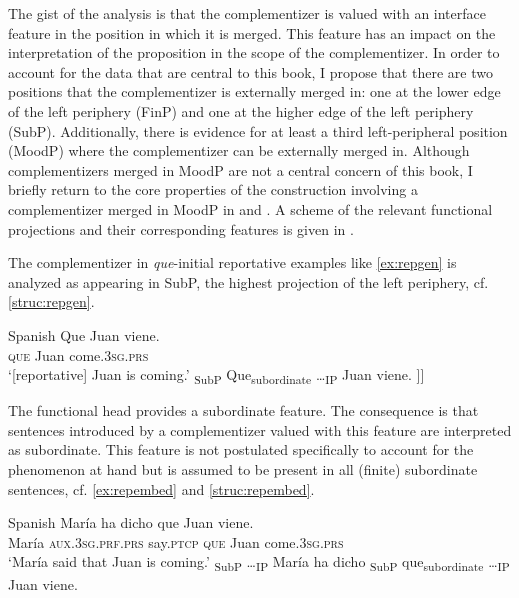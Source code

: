 The gist of the analysis is that the complementizer is valued with an interface feature in the position in which it is merged. This feature  has an impact on the interpretation of the proposition in the scope of the complementizer. In order to account for the data that are central to this book, I propose that there are two positions that the complementizer is externally merged in: one  at the lower edge of the left periphery (FinP) and one at the higher edge of the left periphery (SubP). Additionally, there is evidence for at least a third left-peripheral position (MoodP) where the complementizer can be externally merged in. Although complementizers merged in MoodP are not a central concern of this book, I briefly return to the core properties of  the construction involving a complementizer  merged in MoodP in  and . A scheme of the relevant functional projections and their corresponding features is given in .


The complementizer in \emph{que}-initial reportative examples like \eqref{ex:repgen} is analyzed as appearing in SubP, the highest projection of the left periphery, cf. \eqref{struc:repgen}.

\ea Spanish
\ea\label{ex:repgen}
\gll  Que Juan viene. \\
\textsc{que} Juan come.\textsc{3sg.prs}\\
\glt`[reportative] Juan is coming.'
\ex\label{struc:repgen} {\ob}\textsubscript{SubP} Que\textsubscript{subordinate} \dots {\ob}\textsubscript{IP} Juan viene. ]]
\z
\z

The functional head provides a subordinate feature. The consequence is that sentences introduced by a complementizer valued with this feature are interpreted as subordinate. This feature is not postulated specifically to account for the phenomenon at hand but is assumed to be present in all (finite)   subordinate sentences, cf. \eqref{ex:repembed} and \eqref{struc:repembed}.

\ea Spanish
\ea\label{ex:repembed}
\gll  María ha dicho que Juan viene. \\
	María \textsc{aux.3sg.prf.prs} say.\textsc{ptcp} \textsc{que} Juan come.\textsc{3sg.prs}\\
	\glt`María said that Juan is coming.'
	\ex\label{struc:repembed} {\ob}\textsubscript{SubP} \dots {\ob}\textsubscript{IP} María ha dicho {\ob}\textsubscript{SubP} que\textsubscript{subordinate} \dots {\ob}\textsubscript{IP} Juan viene. {\cb}{\cb}{\cb}{\cb}
\z
\z

